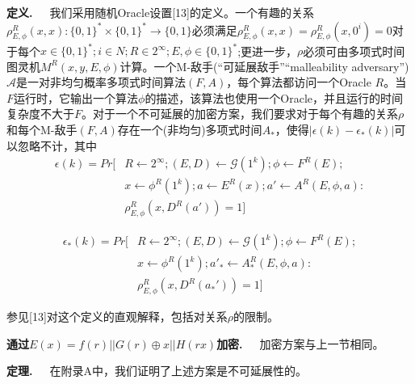 \documentclass[]{article}
\begin{document}
    
    \textbf{定义.}\ \ \ 
    我们采用随机Oracle设置[13]的定义。一个有趣的关系$\rho_{E,\phi}^{R}(x,x):\{0,1\}^*\times\{0,1\}^*\rightarrow \{0,1\}$必须满足$\rho_{E,\phi}^{R}(x,x)=\rho_{E,\phi}^{R}(x,0^i)= 0$对于每个$x\in\{0,1\}^*;i\in N; R\in 2^\infty;E,\phi \in \{0,1\}^*$;更进一步，$\rho$必须可由多项式时间图灵机$M^R(x, y,E,\phi)$计算。一个M-敌手(“可延展敌手”“malleability adversary”)$\mathcal{A}$是一对非均匀概率多项式时间算法$(F,A)$，每个算法都访问一个Oracle $R$。当$F$运行时，它输出一个算法$\phi$的描述，该算法也使用一个Oracle，并且运行的时间复杂度不大于$F$。对于一个不可延展的加密方案，我们要求对于每个有趣的关系$\rho$和每个M-敌手$(F,A)$存在一个(非均匀)多项式时间$A_*$，使得$|\epsilon(k)-\epsilon_*(k)|$可以忽略不计，其中
    \begin{align*}
    	\epsilon(k)=Pr[&R\leftarrow 2^\infty;(E,D)\leftarrow \mathcal{G}(1^k);\phi \leftarrow F^R(E);\\
    	               &x \leftarrow {\phi}^R(1^k);a\leftarrow E^R(x);a'\leftarrow A^R(E,\phi,a):\\
    	               &\rho_{E,\phi}^R(x,D^R(a'))=1]
    \end{align*}
    
    \begin{align*}
    \epsilon_*(k)=Pr[&R\leftarrow 2^\infty;(E,D)\leftarrow \mathcal{G}(1^k);\phi \leftarrow F^R(E);\\
                     &x\leftarrow \phi^R(1^k);a'_*\leftarrow A_*^R(E,\phi,a):\\
                     &\rho_{E,\phi}^R(x,D^R(a_*'))=1]
    \end{align*}
    
    参见[13]对这个定义的直观解释，包括对关系$\rho$的限制。
    
    
    \textbf{通过$E(x)=f(r)||G(r)\oplus x|| H(rx)$加密.}\ \ \ 
    加密方案与上一节相同。
    
    
    \textbf{定理.}\ \ \ 
    在附录A中，我们证明了上述方案是不可延展性的。
    
    
    
\end{document}
